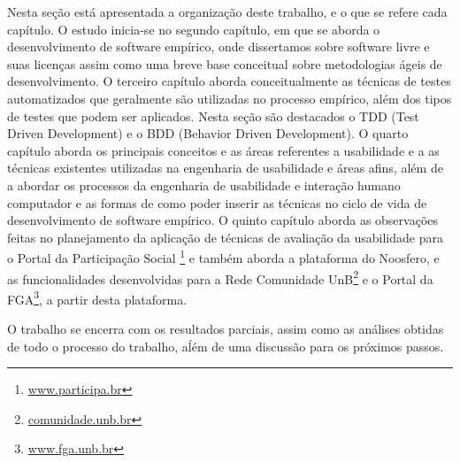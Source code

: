 Nesta seção está apresentada a organização deste trabalho, e o que se refere cada capítulo.
%
O estudo inicia-se no segundo capítulo, em que se aborda o desenvolvimento de software empírico, onde dissertamos sobre software livre e suas licenças assim como uma breve base conceitual sobre metodologias ágeis de desenvolvimento.
%
O terceiro capítulo aborda conceitualmente as técnicas de testes automatizados que geralmente são utilizadas no processo empírico, além dos tipos de testes que podem ser aplicados. Nesta seção são destacados o TDD (Test Driven Development) e o BDD (Behavior Driven Development).
%
O quarto capítulo aborda os principais conceitos e as áreas referentes a usabilidade e a as técnicas existentes utilizadas na engenharia de usabilidade e áreas afins, além de a abordar os processos da engenharia de usabilidade e interação humano computador e as formas de como poder inserir as técnicas no ciclo de vida de desenvolvimento de software empírico.
%
O quinto capítulo aborda as observações feitas no planejamento da aplicação de técnicas de avaliação da usabilidade para o Portal da Participação Social \footnote{\url{www.participa.br}} e também aborda a plataforma do Noosfero, e as funcionalidades desenvolvidas para a Rede Comunidade UnB\footnote{\url{comunidade.unb.br}} e o Portal da FGA\footnote{\url{www.fga.unb.br}}, a partir desta plataforma.

O trabalho se encerra com os resultados parciais, assim como as análises obtidas de todo o processo do trabalho, aĺém de uma discussão para os próximos passos.

